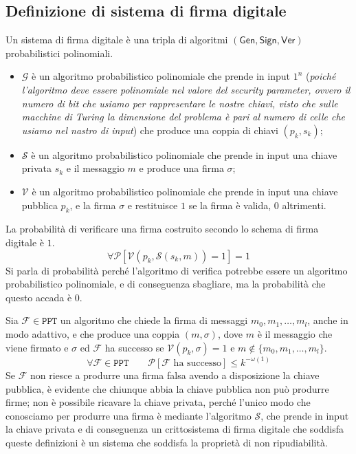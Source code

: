 \subsection{Definizione di sistema di firma digitale}
Un sistema di firma digitale è una tripla di algoritmi $(\mathsf{Gen}, \mathsf{Sign}, \mathsf{Ver})$ probabilistici 
polinomiali.
\begin{itemize}
  \item $\mathcal{G}$ è un algoritmo probabilistico polinomiale che prende in input $1^n$ (\textit{poiché 
  l'algoritmo deve essere polinomiale nel valore del security parameter, ovvero il numero di bit che usiamo 
  per rappresentare le nostre chiavi, visto che sulle macchine di Turing la dimensione del problema è 
  pari al numero di celle che usiamo nel nastro di input}) che produce una coppia di chiavi $(p_k, s_k)$;
  \item $\mathcal{S}$ è un algoritmo probabilistico polinomiale che prende in input una chiave privata $s_k$
  e il messaggio $m$ e produce una firma $\sigma$;
  \item $\mathcal{V}$ è un algoritmo probabilistico polinomiale che prende in input una chiave pubblica $p_k$,
  e la firma $\sigma$ e restituisce $1$ se la firma è valida, $0$ altrimenti.
\end{itemize}
La probabilità di verificare una firma costruito secondo lo schema di firma digitale è $1$.
\[
  \forall \mathcal{P}\left[ \mathcal{V}(p_k, \mathcal{S}(s_k, m)) = 1 \right] = 1
\]
Si parla di probabilità perché l'algoritmo di verifica potrebbe essere un algoritmo probabilistico polinomiale,
e di conseguenza sbagliare, ma la probabilità che questo accada è $0$.

Sia $\mathcal{F} \in \texttt{PPT}$ un algoritmo che chiede la firma di messaggi $m_0, m_1, \dots, m_l$, anche 
in modo adattivo, e che produce una coppia $(m, \sigma)$, dove $m$ è il messaggio che viene firmato e $\sigma$ 
ed $\mathcal{F}$ ha successo se $\mathcal{V}(p_k, \sigma) = 1$ e $m \notin \{m_0, m_1, \dots, m_l\}$.
\[
  \forall \mathcal{F} \in \texttt{PPT} \qquad \mathcal{P}\left[ \mathcal{F} \text{ ha successo} \right] 
  \leq k^{-\omega(1)}
\]
Se $\mathcal{F}$ non riesce a produrre una firma falsa avendo a disposizione la chiave pubblica, è 
evidente che chiunque abbia la chiave pubblica non può produrre firme; non è possibile ricavare la chiave privata, 
perché l'unico modo che conosciamo per produrre una firma è mediante l'algoritmo $\mathcal{S}$, che prende in 
input la chiave privata e di conseguenza un crittosistema di firma digitale che soddisfa queste definizioni 
è un sistema che soddisfa la proprietà di non ripudiabilità.

